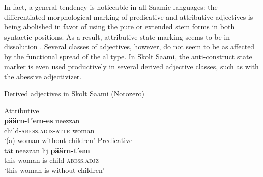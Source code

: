 In fact, a general tendency is noticeable in all Saamic languages: the differentiated morphological marking of predicative and attributive adjectives is being abolished in favor of using the pure or extended stem forms in both syntactic positions. As a result, attributive state marking seems to be in dissolution \citep{riesler2006b}. Several classes of adjectives, however, do not seem to be as affected by the functional spread of the al type. In Skolt Saami, the anti\hyp{}construct state marker is even used productively in several derived adjective classes, such as with the abessive adjectivizer.
\begin{exe}
\ex \rm{Derived adjectives in Skolt Saami (Notozero) \citep[279]{senkevic-g1968}}
\begin{xlist}
\ex \rm{Attributive}\\
\gll	\textbf{päärn-tʹem-es} neezzan\\
	child-\textsc{abess.adjz-attr} woman\\
\glt	‘(a) woman without children’
\ex \rm{Predicative}\\
\gll 	tät neezzan lij \textbf{päärn-tʹem}\\
	this woman is child-\textsc{abess.adjz}\\
\glt	‘this woman is without children’
\end{xlist}
\end{exe}

